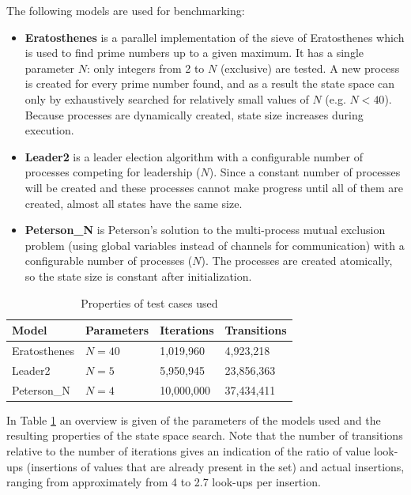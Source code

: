 \documentclass{acm_proc_article-sp}
\begin{document}

The following models are used for benchmarking:
\begin{itemize}
\item\textbf{Eratosthenes} is a parallel implementation of the sieve
of Eratosthenes which is used to find prime numbers up to a given maximum.
It has a single parameter $N$: only integers from 2 to $N$ (exclusive) are
tested. A new process is created for every prime number found, and as a result
the state space can only by exhaustively searched for relatively small values
of $N$ (e.g. $N < 40$). Because processes are dynamically created, state size
increases during execution.

\item\textbf{Leader2} is a leader election algorithm with a configurable number
of processes competing for leadership ($N$). Since a constant number of
processes will be created and these processes cannot make progress until all
of them are created, almost all states have the same size.

\item\textbf{Peterson\_N} is Peterson's solution to the multi-process mutual
exclusion problem (using global variables instead of channels for
communication) with a configurable number of processes ($N$). The processes
are created atomically, so the state size is constant after initialization.
\end{itemize}

\begin{table}
\begin{center}
\begin{tabular}{ l l l l }
\hline
\textbf{Model} & \textbf{Parameters} & \textbf{Iterations} & \textbf{Transitions} \\
\hline
Eratosthenes & $N=40$ &  1,019,960 &  4,923,218 \\
Leader2      & $N=5$  &  5,950,945 & 23,856,363 \\
Peterson\_N  & $N=4$  & 10,000,000 & 37,434,411 \\
\hline
\end{tabular}
\caption{Properties of test cases used}
\label{tab-cases}
\end{center}
\end{table}


In Table \ref{tab-cases} an overview is given of the parameters of the models used
and the resulting properties of the state space search.
Note that the number of transitions relative to the number of iterations gives an
indication of the ratio of value look-ups (insertions of values that are already
present in the set) and actual insertions, ranging from approximately from 4 to
2.7 look-ups per insertion.
\end{document}
